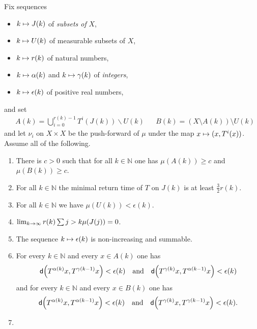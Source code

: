 \documentclass[10pt]{amsart}
\theoremstyle{definition}\newtheorem{defi}[theo]{Definition}\newtheorem{rema}[theo]{Remark}\newtheorem{exam}[theo]{Example}\newtheorem{exem}[theo]{Example}\newtheorem{nota}[theo]{Notation}
\newcommand{\N}{\mathbb{N}}
\newcommand{\metric}{\mathsf{d}}
\let\originalleft\left
\let\originalright\right
\renewcommand{\left}{\mathopen{}\mathclose\bgroup\originalleft}
\renewcommand{\right}{\aftergroup\egroup\originalright}
\renewcommand*{\to}{\mathchoice{\longrightarrow}{\rightarrow}{\rightarrow}{\rightarrow}}
\let\oldmapsto\mapsto
\renewcommand*{\mapsto}{\mathchoice{\longmapsto}{\oldmapsto}{\oldmapsto}{\oldmapsto}}
\newcommand*{\relabel}{\renewcommand{\labelenumi}{(\theenumi)}}
\newcommand*{\Jenumi}{\renewcommand*{\theenumi}{J\arabic{enumi}}\relabel}
\begin{document}
\pagebreak{}

\begin{prop}\label{prop:ce}
Fix sequences
\begin{itemize}
\item $k \mapsto J(k)$ of \emph{subsets of} $X$,
\item $k \mapsto U(k)$ of measurable subsets of $X$,
\item $k \mapsto r(k)$ of natural numbers,
\item $k \mapsto \alpha(k)$ and $k \mapsto \gamma(k)$ of \emph{integers},
\item $k \mapsto \epsilon(k)$ of positive real numbers,
\end{itemize}
and set
\begin{align}\label{eq:U only bad}
&A(k) = \bigcup_{i=0}^{r(k)-1} T^i (J(k)) \backslash U(k)
&&B(k) = (X \setminus A(k)) \setminus U(k)
\end{align}
and let $\nu_i$ on $X \times X$ be the push-forward of $\mu$ under the map $x \mapsto (x, T^i(x))$. Assume all of the following.
\begin{enumerate}\Jenumi
\item\label{ce:proportion}
There is $c > 0$ such that for all $k \in \N$ one has $\mu(A(k)) \ge c$ and $\mu(B(k)) \ge c$.
\item\label{ce:return}
For all $k \in \N $ the minimal return time of $T$ on $J(k)$ is at least $\frac{3}{2} r(k)$.
\item\label{ce:discard}
For all $k \in \N$ we have $\mu(U(k)) < \epsilon(k)$.
\item\label{ce:shrinking}
$\lim_{k \to \infty} r(k) \sum{j > k} \mu(J(j)) = 0$.
\item\label{ce:error}
The sequence $k \mapsto \epsilon(k)$ is non-increasing and summable.
\item\label{ce:nearness}
For every $k \in \N$ and every $x \in A(k)$ one has
\begin{equation}\label{ce:nearness_1}
\metric\left(T^{\alpha(k)} x, T^{\gamma(k-1)} x\right) < \epsilon(k)
\quad \text{and} \quad
\metric\left(T^{\gamma(k)} x, T^{\alpha(k-1)} x\right) < \epsilon(k)
\end{equation}
and for every $k \in \N$ and every $x \in B(k)$ one has
\begin{equation}\label{ce:nearness_2}
\metric\left(T^{\alpha(k)} x, T^{\alpha(k-1)} x\right) < \epsilon(k)
\quad\text{and}\quad
\metric\left(T^{\gamma(k)} x, T^{\gamma(k-1)} x\right) < \epsilon(k).
\end{equation}
\item\label{ce:kr}

\end{enumerate}
\end{prop}
\end{document}
